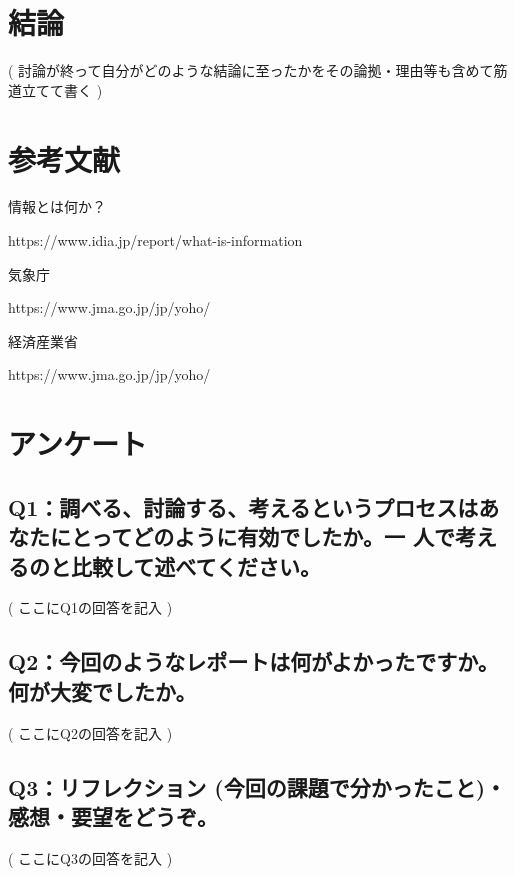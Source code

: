 \documentclass[12pt,a4j]{jarticle}
\begin{document}
\section{結論}
( 討論が終って自分がどのような結論に至ったかをその論拠・理由等も含めて筋道立てて書く )

\section{参考文献}

情報とは何か？

https://www.idia.jp/report/what-is-information

気象庁

https://www.jma.go.jp/jp/yoho/

経済産業省

https://www.jma.go.jp/jp/yoho/

\section{アンケート}

\subsection{Q1：調べる、討論する、考えるというプロセスはあなたにとってどのように有効でしたか。一 人で考えるのと比較して述べてください。}
( ここにQ1の回答を記入 )

\subsection{Q2：今回のようなレポートは何がよかったですか。何が大変でしたか。}
( ここにQ2の回答を記入 )

\subsection{Q3：リフレクション (今回の課題で分かったこと)・感想・要望をどうぞ。}
( ここにQ3の回答を記入 )
\end{document}
